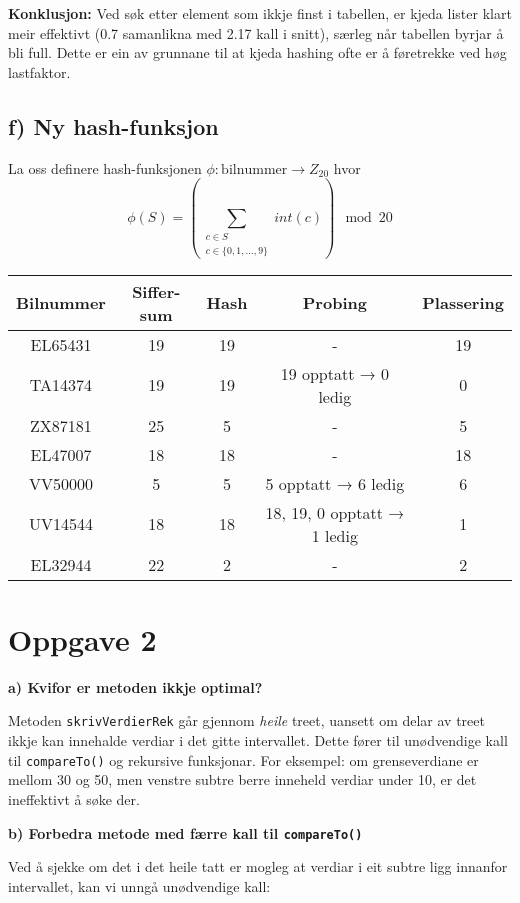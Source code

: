 \documentclass[12pt]{article}
\begin{document}
\noindent 
\textbf{Konklusjon:} Ved søk etter element som ikkje finst i tabellen, 
er kjeda lister klart meir effektivt (0.7 samanlikna med 2.17 kall i snitt), 
særleg når tabellen byrjar å bli full. Dette er ein av grunnane til at kjeda hashing 
ofte er å føretrekke ved høg lastfaktor.

\subsection*{f) Ny hash-funksjon}
La oss definere hash-funksjonen \(\phi : \text{bilnummer} \to Z_{20}\) hvor 
\[
    \phi(S) = \left(\displaystyle\sum_{\substack{c\in S \\ c\in \{0,1,\dots,9\}}} 
    int(c) \right)\mod 20
\]

\begin{tabular}{|c|c|c|c|c|}
\hline
\textbf{Bilnummer} & \textbf{Siffer-sum} & \textbf{Hash} & \textbf{Probing} & \textbf{Plassering} \\
\hline
EL65431   & 19  & 19  & -         & 19 \\
TA14374   & 19  & 19  & 19 opptatt → 0 ledig & 0 \\
ZX87181   & 25  & 5   & -         & 5  \\
EL47007   & 18  & 18  & -         & 18 \\
VV50000   & 5   & 5   & 5 opptatt → 6 ledig & 6 \\
UV14544   & 18  & 18  & 18, 19, 0 opptatt → 1 ledig & 1 \\
EL32944   & 22  & 2   & -         & 2 \\
\hline
\end{tabular}

\break
\section*{Oppgave 2}

\noindent 
\textbf{a) Kvifor er metoden ikkje optimal?}

\noindent 
Metoden \texttt{skrivVerdierRek} går gjennom \emph{heile} treet, 
uansett om delar av treet ikkje kan innehalde verdiar i det gitte intervallet. 
Dette fører til unødvendige kall til \texttt{compareTo()} og rekursive funksjonar. 
For eksempel: om grenseverdiane er mellom 30 og 50, men venstre subtre berre inneheld 
verdiar under 10, er det ineffektivt å søke der.

\noindent 
\textbf{b) Forbedra metode med færre kall til \texttt{compareTo()}}

\noindent 
Ved å sjekke om det i det heile tatt er mogleg at verdiar i eit subtre ligg 
innanfor intervallet, kan vi unngå unødvendige kall:
\end{document}
